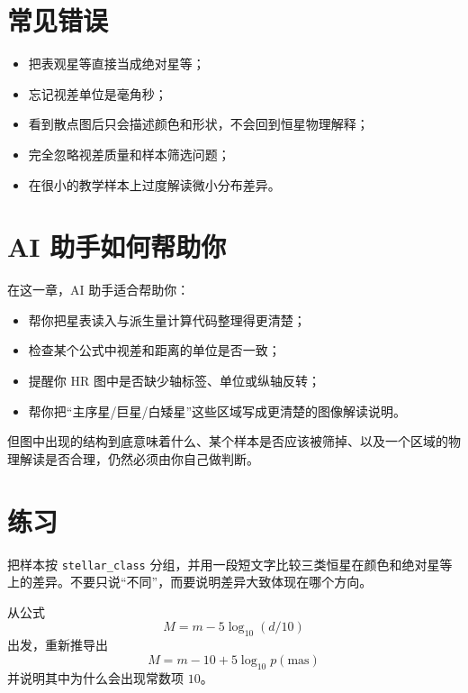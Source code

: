 \section{常见错误}

\begin{warnbox}
\begin{itemize}
    \item 把表观星等直接当成绝对星等；
    \item 忘记视差单位是毫角秒；
    \item 看到散点图后只会描述颜色和形状，不会回到恒星物理解释；
    \item 完全忽略视差质量和样本筛选问题；
    \item 在很小的教学样本上过度解读微小分布差异。
\end{itemize}
\end{warnbox}

\section{AI 助手如何帮助你}

在这一章，AI 助手适合帮助你：

\begin{itemize}
    \item 帮你把星表读入与派生量计算代码整理得更清楚；
    \item 检查某个公式中视差和距离的单位是否一致；
    \item 提醒你 HR 图中是否缺少轴标签、单位或纵轴反转；
    \item 帮你把“主序星/巨星/白矮星”这些区域写成更清楚的图像解读说明。
\end{itemize}

但图中出现的结构到底意味着什么、某个样本是否应该被筛掉、以及一个区域的物理解读是否合理，仍然必须由你自己做判断。

\section{练习}

\begin{exercisebox}[基础练习]
把样本按 \texttt{stellar\_class} 分组，并用一段短文字比较三类恒星在颜色和绝对星等上的差异。不要只说“不同”，而要说明差异大致体现在哪个方向。
\end{exercisebox}

\begin{exercisebox}[进阶练习]
从公式
\[
M = m - 5\log_{10}(d/10)
\]
出发，重新推导出
\[
M = m - 10 + 5\log_{10} p(\mathrm{mas})
\]
并说明其中为什么会出现常数项 $10$。
\end{exercisebox}


